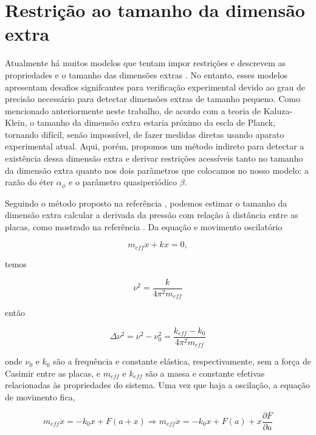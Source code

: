 \section{Restrição ao tamanho da dimensão extra}
Atualmente há muitos modelos que tentam impor restrições e descrevem as propriedades e o tamanho das dimensões extras \cite{MurataTanaka2015}. No entanto, esses modelos apresentam desafios signifcantes para verificação experimental devido ao grau de precisão necessário para detectar dimensões extras de tamanho pequeno. Como mencionado anteriormente neste trabalho, de acordo com a teoria de Kaluza-Klein, o tamanho da dimensão extra estaria próximo da escla de Planck, tornando difícil, senão impossível, de fazer medidas diretas usando aparato experimental atual. Aqui, porém, propomos um método indireto para detectar a existência dessa dimensão extra e derivar restrições acessíveis tanto no tamanho da dimensão extra quanto nos dois parâmetros que colocamos no nosso modelo: a razão do éter $\alpha_\phi$ e o parâmetro quasiperiódico $\beta$. 

Seguindo o método proposto na referência \cite{Pascoal2008}, podemos estimar o tamanho da dimensão extra calcular a derivada da pressão com relação à distância entre as placas, como mostrado na referência \cite{Bressi2000}. Da equação e movimento oscilatório

\begin{equation}
    m_{eff}\ddot{x} + kx = 0,
\end{equation}

temos

\begin{equation}
    \nu^2 = \frac{k}{4\pi^2m_{eff}}
\end{equation}

então 

\begin{equation}
    \Delta \nu^2 = \nu^2 - \nu_0^2 = \frac{k_{eff} - k_0}{4\pi^2 m_{eff}}
\end{equation}

onde $\nu_0$ e $k_0$ são a frequência e constante elástica, respectivamente, sem a força de Casimir entre as placas, e $m_{eff}$ e $k_{eff}$ são a massa e constante efetivas relacionadas às propriedades do sistema. Uma vez que haja a oscilação, a equação de movimento fica,

\begin{equation}
    m_{eff} \ddot{x} = -k_0x + F(a+x) \Rightarrow m_{eff} \ddot{x} = -k_0x + F(a) + x \frac{\partial F}{\partial a} 
\end{equation}

